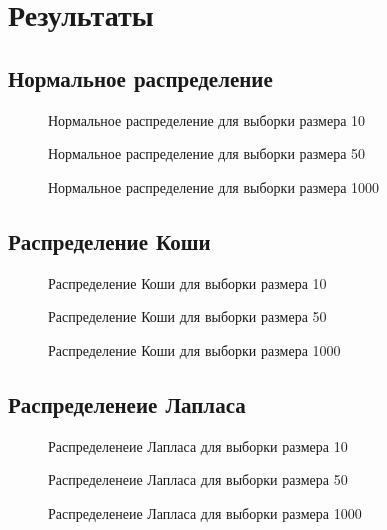 \documentclass{article}
\begin{document}
\section{Результаты}

\subsection{Нормальное распределение}
\begin{figure}[h]
\caption{Нормальное распределение для выборки размера 10}
\end{figure}
\begin{figure}[h]
\caption{Нормальное распределение для выборки размера 50}
\end{figure}
\begin{figure}[h]
\caption{Нормальное распределение для выборки размера 1000}
\end{figure}

\newpage
\subsection{Распределение Коши}
\begin{figure}[h]
\caption{Распределение Коши для выборки размера 10}
\end{figure}
\begin{figure}[h]
\caption{Распределение Коши для выборки размера 50}
\end{figure}
\begin{figure}[h]
\caption{Распределение Коши для выборки размера 1000}
\end{figure}

\newpage
\subsection{Распределенеие Лапласа}
\begin{figure}[h]
\caption{Распределенеие Лапласа для выборки размера 10}
\end{figure}
\begin{figure}[h]
\caption{Распределенеие Лапласа для выборки размера 50}
\end{figure}
\begin{figure}[h]
\caption{Распределенеие Лапласа для выборки размера 1000}
\end{figure}
\end{document}

